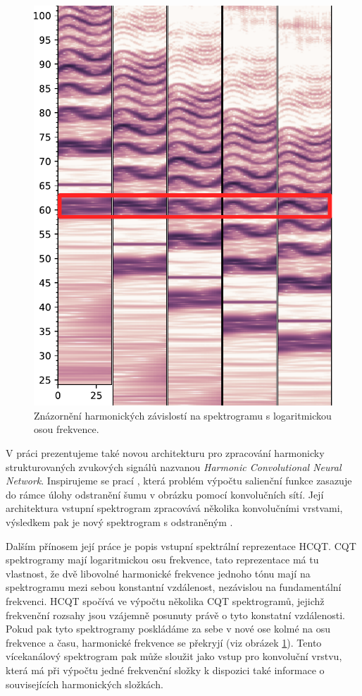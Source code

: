 \begin{figure}[h]\centering
    \includegraphics[scale=0.5]{../img/spectrograms}
\caption{Znázornění harmonických závislostí na spektrogramu s logaritmickou osou frekvence.}\label{obr:hcqt}
\end{figure}

V práci prezentujeme také novou architekturu pro zpracování harmonicky strukturovaných zvukových signálů nazvanou \emph{Harmonic Convolutional Neural Network}. Inspirujeme se prací \cite{Bittner2017}, která problém výpočtu salienční funkce zasazuje do rámce úlohy odstranění šumu v obrázku pomocí konvolučních sítí. Její architektura vstupní spektrogram zpracovává několika konvolučními vrstvami, výsledkem pak je nový spektrogram s odstraněným . 

Dalším přínosem její práce je popis vstupní spektrální reprezentace HCQT. CQT spektrogramy mají logaritmickou osu frekvence, tato reprezentace má tu vlastnost, že dvě libovolné harmonické frekvence jednoho tónu mají na spektrogramu mezi sebou konstantní vzdálenost, nezávislou na fundamentální frekvenci. HCQT spočívá ve výpočtu několika CQT spektrogramů, jejichž frekvenční rozsahy jsou vzájemně posunuty právě o tyto konstatní vzdálenosti. Pokud pak tyto spektrogramy poskládáme za sebe v nové ose kolmé na osu frekvence a času, harmonické frekvence se překryjí (viz obrázek \ref{obr:hcqt}). Tento vícekanálový spektrogram pak může sloužit jako vstup pro konvoluční vrstvu, která má při výpočtu jedné frekvenční složky k dispozici také informace o souvisejících harmonických složkách.

